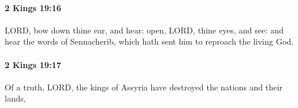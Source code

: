 		\paragraph{2 Kings 19:16} %
			\label{2KINGS-19-16}

			LORD, bow down thine ear, and hear: open, LORD, thine eyes, and see: and hear the words of Sennacherib, which hath sent him to reproach the living God.


		\paragraph{2 Kings 19:17} %
			\label{2KINGS-19-17}

			Of a truth, LORD, the kings of Assyria have destroyed the nations and their lands,


